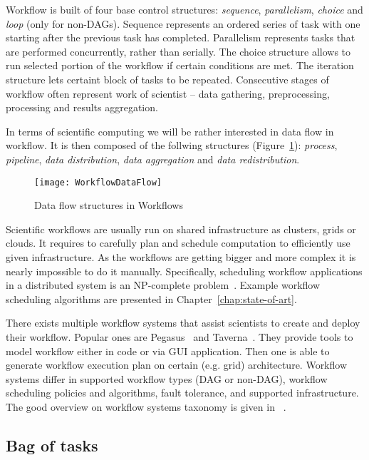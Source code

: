 Workflow is built of four base control structures: \emph{sequence}, \emph{parallelism}, \emph{choice} and \emph{loop} (only for non-DAGs). Sequence represents an ordered series of task with one starting after the previous task has completed. Parallelism represents tasks that are performed concurrently, rather than serially. The choice structure allows to run selected portion of the workflow if certain conditions are met. The iteration structure lets certaint block of tasks to be repeated. Consecutive stages of workflow often represent work of scientist – data gathering, preprocessing, processing and results aggregation. 

In terms of scientific computing we will be rather interested in data flow in workflow. It is then composed of the follwing structures (Figure~\ref{fig:intro:workflow:structures}): \emph{process}, \emph{pipeline}, \emph{data distribution}, \emph{data aggregation} and \emph{data redistribution}.

\begin{figure}[tb]
   \centering
   \texttt{[image: WorkflowDataFlow]}  
   \caption{Data flow structures in Workflows~\cite{Bharathi08}}
   \label{fig:intro:workflow:structures}
\end{figure} 


Scientific workflows are usually run on shared infrastructure as clusters, grids or clouds. It requires to carefully plan and schedule computation to efficiently use given infrastructure. As the workflows are getting bigger and more complex it is nearly impossible to do it manually. Specifically, scheduling workflow applications in a distributed system is an NP-complete problem~\cite{Garey:1979:CIG:578533}. Example workflow scheduling algorithms are presented in Chapter \ref{chap:state-of-art}.

There exists multiple workflow systems that assist scientists to create and deploy their workflow. Popular ones are Pegasus~\cite{Pegasus} and Taverna~\cite{Taverna}. They provide tools to model workflow either in code or via GUI application. Then one is able to generate workflow execution plan on certain (e.g. grid) architecture. Workflow systems differ in supported workflow types (DAG or non-DAG), workflow scheduling policies and algorithms, fault tolerance, and supported infrastructure. The good overview on workflow systems taxonomy is given in ~\cite{Yu:2005:TSW:1084805.1084814}.

\subsection{Bag of tasks}

